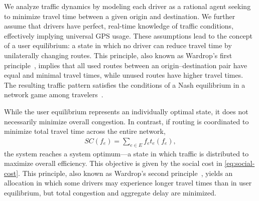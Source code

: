 \documentclass[twocolumn,english,groupedaddress, superscriptaddress,aps,pre,10pt,floatfix]{revtex4-2}
\begin{document}

We analyze traffic dynamics by modeling each driver as a rational agent seeking to minimize travel time between a given origin and destination. We further assume that drivers have perfect, real-time knowledge of traffic conditions, effectively implying universal GPS usage. These assumptions lead to the concept of a user equilibrium: a state in which no driver can reduce travel time by unilaterally changing routes. This principle, also known as Wardrop's first principle~\cite{wardrop1952road}, implies that all used routes between an origin--destination pair have equal and minimal travel times, while unused routes have higher travel times. The resulting traffic pattern satisfies the conditions of a Nash equilibrium in a network game among travelers~\cite{koutsoupias1999worst, roughgarden2002bad}.

While the user equilibrium represents an individually optimal state, it does not necessarily minimize overall congestion. In contrast, if routing is coordinated to minimize total travel time across the entire network,
\begin{align}\label{eq:social-cost}
SC(f_e) = \sum_{e\in E} f_e t_e(f_e),
\end{align}
the system reaches a system optimum---a state in which traffic is distributed to maximize overall efficiency. This objective is given by the social cost in \cref{eq:social-cost}. This principle, also known as Wardrop's second principle~\cite{wardrop1952road}, yields an allocation in which some drivers may experience longer travel times than in user equilibrium, but total congestion and aggregate delay are minimized.
\end{document}
